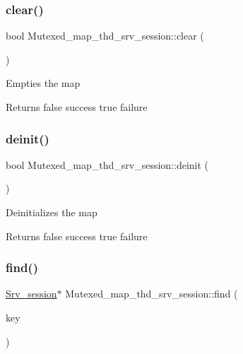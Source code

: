\subsubsection{\texorpdfstring{clear()}{clear()}}
{\footnotesize\ttfamily bool Mutexed\+\_\+map\+\_\+thd\+\_\+srv\+\_\+session\+::clear (\begin{DoxyParamCaption}{ }\end{DoxyParamCaption})\hspace{0.3cm}{\ttfamily [inline]}}

Empties the map

\begin{DoxyReturn}{Returns}
false success true failure 
\end{DoxyReturn}
\mbox{\label{classMutexed__map__thd__srv__session_a4b06c343737e4ef2e46f2eeecdeeb187}} 
\subsubsection{\texorpdfstring{deinit()}{deinit()}}
{\footnotesize\ttfamily bool Mutexed\+\_\+map\+\_\+thd\+\_\+srv\+\_\+session\+::deinit (\begin{DoxyParamCaption}\item[{void}]{ }\end{DoxyParamCaption})\hspace{0.3cm}{\ttfamily [inline]}}

Deinitializes the map

\begin{DoxyReturn}{Returns}
false success true failure 
\end{DoxyReturn}
\mbox{\label{classMutexed__map__thd__srv__session_afbc580641d60bb9ac333db5a826e098f}} 
\subsubsection{\texorpdfstring{find()}{find()}}
{\footnotesize\ttfamily \mbox{\hyperlink{classSrv__session}{Srv\+\_\+session}}$\ast$ Mutexed\+\_\+map\+\_\+thd\+\_\+srv\+\_\+session\+::find (\begin{DoxyParamCaption}\item[{const T\+HD $\ast$}]{key }\end{DoxyParamCaption})\hspace{0.3cm}{\ttfamily [inline]}}

